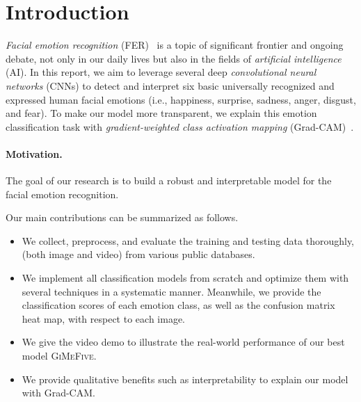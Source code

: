 \section{Introduction}
\label{sec:intro}

\textit{Facial emotion recognition} (FER)~\cite{Ko18,JainSS19,YinTLS019,Malik0R21} is a topic of significant frontier and ongoing debate, 
not only in our daily lives but also in the fields of \textit{artificial intelligence} (AI).
In this report, we aim to leverage several deep 
\textit{convolutional neural networks} (CNNs) to detect and interpret six basic universally recognized and expressed human facial emotions 
(i.e., happiness, surprise, sadness, anger, disgust, and fear). 
To make our model more transparent, 
we explain this emotion classification task with \textit{gradient-weighted class activation mapping} 
(Grad-CAM)~\cite{SelvarajuCDVPB17}. 

\paragraph{Motivation.} %
The goal of our research is to build a robust and interpretable model for the facial emotion recognition.

Our main contributions can be summarized as follows.
\begin{itemize}
  \item We collect, preprocess, and evaluate the training and testing data thoroughly, 
  (both image and video) from various public databases. 
  \item We implement all classification models from scratch and optimize them with several techniques in a systematic manner. 
  Meanwhile, we provide the classification scores of each emotion class, 
  as well as the confusion matrix heat map, with respect to each image. 
  \item We give the video demo to illustrate the real-world performance of our best model \textsc{GiMeFive}. 
  \item We provide qualitative benefits such as interpretability to explain our model with Grad-CAM. %
\end{itemize}

